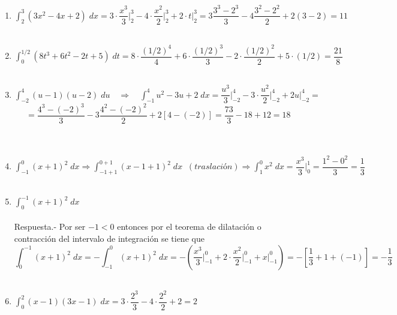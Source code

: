 \begin{enumerate}[\bfseries 1.]
    \item $\displaystyle\int_2^3 (3x^2 - 4x + 2) \; dx = 3\cdot \dfrac{x^3}{3}\bigg|_2^3 - 4\cdot \dfrac{x^2}{2}\bigg|_2^3 + 2\cdot t\bigg|_2^3 = 3\dfrac{3^3-2^3}{3} - 4\dfrac{3^2-2^2}{2} + 2(3-2) = 11$\\\\

    \item $\displaystyle\int_0^{1/2} (8t^3 + 6 t^2 - 2t +5)\; dt  = 8\cdot \dfrac{(1/2)^4}{4} + 6\cdot\dfrac{(1/2)^3}{3} - 2\cdot \dfrac{(1/2)^2}{2} + 5\cdot (1/2) = \dfrac{21}{8} $\\\\

    \item $\displaystyle\int_{-2}^4 (u-1)(u-2)\; du \quad \Longrightarrow \quad \int_{-1}^4 u^2 - 3u + 2\; dx = \dfrac{u^3}{3}\bigg|_{-2}^4 - 3\cdot \dfrac{u^2}{2}\bigg|_{-2}^4 + 2u\bigg|_{-2}^4 = $ $$=\dfrac{4^3 - (-2)^3}{3}-3\dfrac{4^2 - (-2)^2}{2} + 2[4 - (-2)] = \dfrac{73}{3} - 18 + 12 = 18$$\\\\

    \item $\displaystyle\int_{-1}^0 (x+1)^2 \; dx \Longrightarrow \int_{-1+1}^{0+1} (x-1+1)^2 \; dx \; \;(traslación)  \Longrightarrow  \int_{1}^0 x^2 \; dx = \dfrac{x^3}{3}\bigg|_0^1 = \dfrac{1^2 - 0^2}{3} =\dfrac{1}{3}$\\\\

    \item $\displaystyle\int_0^{-1} (x+1)^2\; dx$\\\\
	Respuesta.-\; Por ser $-1<0$ entonces por el teorema de dilatación o contracción del intervalo de integración se tiene que $$\int_{0}^{-1} (x+1)^2\; dx = -\int_{-1}^0 (x+1)^2 \; dx = - \left( \dfrac{x^3}{3}\bigg|_{-1}^0 + 2\cdot \dfrac{x^2}{2}\bigg|_{-1}^0 + x \bigg|_{-1}^0 \right) = - \left[\dfrac{1}{3} + 1 + (-1)\right]  = - \dfrac{1}{3}$$\\

    \item $\displaystyle\int_0^2 (x-1)(3x-1) \; dx = 3\cdot \dfrac{2^3}{3} - 4\cdot \dfrac{2^2}{2} + 2 = 2$\\\\


\end{enumerate}
